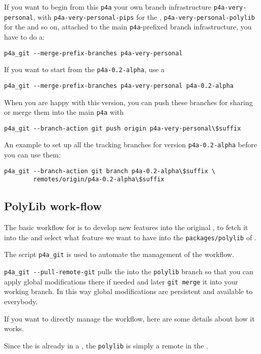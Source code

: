 \documentclass[a4paper]{article}
\begin{document}
If you want to begin from this \texttt{p4a} your own branch infrastructure
\verb|p4a-very-personal|, with \verb|p4a-very-personal-pips| for the
\Apips, \verb|p4a-very-personal-polylib| for the \Apolylib and so on,
attached to the main \verb|p4a|-prefixed branch infrastructure, you have
to do a:
\begin{verbatim}
p4a_git --merge-prefix-branches p4a-very-personal
\end{verbatim}

If you want to start from the \texttt{p4a-0.2-alpha}, use a
\begin{verbatim}
p4a_git --merge-prefix-branches p4a-very-personal p4a-0.2-alpha
\end{verbatim}

When you are happy with this version, you can push these branches for
sharing or merge them into the main \Apfa \texttt{p4a} with
\begin{verbatim}
p4a_git --branch-action git push origin p4a-very-personal\$suffix
\end{verbatim}

An example to set up all the tracking branches for version
\texttt{p4a-0.2-alpha} before you can use them:
\begin{verbatim}
p4a_git --branch-action git branch p4a-0.2-alpha\$suffix \
        remotes/origin/p4a-0.2-alpha\$suffix
\end{verbatim}


\subsection{PolyLib work-flow}
\label{sec:polylib-workflow}

The basic workflow for \Apolylib is to develop new features into the
original \Apolylib{} \Agit, to fetch it into the \Apfa{} \Agit and select what
feature we want to have into the \texttt{packages/polylib} of \Apfa.

The script \verb|p4a_git| is used to automate the management of the
workflow.

\verb|p4a_git --pull-remote-git| pulls the \Apolylib into the
\texttt{polylib} branch so that you can apply global modifications there
if needed and later \texttt{git merge} it into your working branch. In
this way global modifications are persistent and available to everybody.

If you want to directly manage the \Apolylib workflow, here are some
details about how it works.

Since the \Apolylib is already in a \Agit, the \texttt{polylib} is simply
a remote in the \Apfa{} \Agit.
\end{document}
